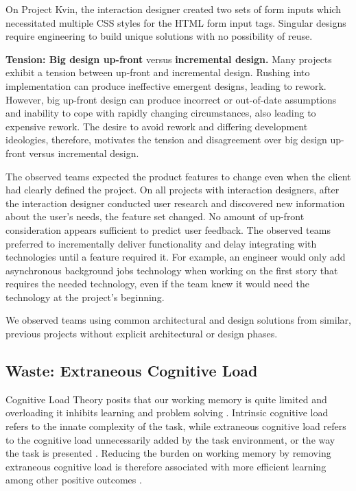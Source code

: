 On Project Kvin, the interaction designer created two sets of form inputs which necessitated multiple CSS styles for the HTML form input tags. Singular designs require engineering to build unique solutions with no possibility of reuse.   

\textbf{Tension: Big design up-front} versus \textbf{incremental design.}
Many projects exhibit a tension between up-front and incremental design. Rushing into implementation can produce ineffective emergent designs, leading to rework. However, big up-front design can produce incorrect or out-of-date assumptions and inability to cope with rapidly changing circumstances, also leading to expensive rework. The desire to avoid rework and differing development ideologies, therefore, motivates the tension and disagreement over big design up-front versus incremental design. 

The observed teams expected the product features to change even when the client had clearly defined the project. On all projects with interaction designers, after the interaction designer conducted user research and discovered new information about the user's needs, the feature set changed. No amount of up-front consideration appears sufficient to predict user feedback. The observed teams preferred to incrementally deliver functionality and delay integrating with technologies until a feature required it. For example, an engineer would only add asynchronous background jobs technology when working on the first story that requires the needed technology, even if the team knew it would need the technology at the project's beginning.

We observed teams using common architectural and design solutions from similar, previous projects without explicit architectural or design phases.

\subsection{Waste: Extraneous Cognitive Load}

Cognitive Load Theory \cite{Sweller1988} posits that our working memory is quite limited and overloading it inhibits learning and problem solving \cite{Artino2008}. Intrinsic cognitive load refers to the innate complexity of the task, while extraneous cognitive load refers to the cognitive load unnecessarily added by the task environment, or the way the task is presented \cite{Sweller2010}. Reducing the burden on working memory by removing extraneous cognitive load is therefore associated with more efficient learning among other positive outcomes \cite{VanSweller2005}.

